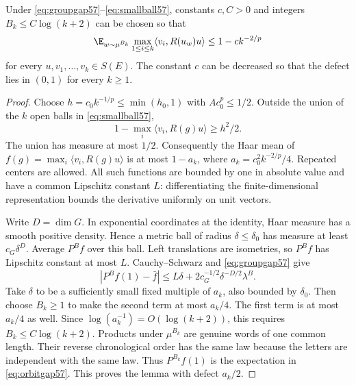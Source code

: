 \begin{lemma}\label{lem:orbitgap57}
Under \eqref{eq:groupgap57}--\eqref{eq:smallball57}, constants $c,C>0$ and integers $B_k\le C\log(k+2)$ can be chosen so that
\begin{equation}\label{eq:orbitgap57}
 \E_{w\sim\mu^{B_k}}\max_{1\le i\le k}
       \langle v_i,R(u_w)u\rangle\le1-c k^{-2/p}
\end{equation}
for every $u,v_1,\ldots,v_k\in S(E)$. The constant $c$ can be decreased so that the defect lies in $(0,1)$ for every $k\ge1$.
\end{lemma}
\begin{proof}
Choose $h=c_0k^{-1/p}\le\min(h_0,1)$ with $A c_0^p\le1/2$. Outside the union of the $k$ open balls in \eqref{eq:smallball57},
\[
 1-\max_i\langle v_i,R(g)u\rangle\ge h^2/2.
\]
The union has measure at most $1/2$. Consequently the Haar mean of
$f(g)=\max_i\langle v_i,R(g)u\rangle$ is at most $1-a_k$, where
$a_k=c_0^2k^{-2/p}/4$. Repeated centers are allowed. All such functions are bounded by one in absolute value and have a common Lipschitz constant $L$: differentiating the finite-dimensional representation bounds the derivative uniformly on unit vectors.

Write $D=\dim G$. In exponential coordinates at the identity, Haar measure has a smooth positive density. Hence a metric ball of radius $\delta\le\delta_0$ has measure at least $c_G\delta^D$. Average $P^Bf$ over this ball. Left translations are isometries, so $P^Bf$ has Lipschitz constant at most $L$. Cauchy--Schwarz and \eqref{eq:groupgap57} give
\[
 |P^Bf(1)-\bar f|
 \le L\delta+2c_G^{-1/2}\delta^{-D/2}\lambda^B.
\]
Take $\delta$ to be a sufficiently small fixed multiple of $a_k$, also bounded by $\delta_0$. Then choose $B_k\ge1$ to make the second term at most $a_k/4$. The first term is at most $a_k/4$ as well. Since $\log(a_k^{-1})=O(\log(k+2))$, this requires $B_k\le C\log(k+2)$. Products under $\mu^{B_k}$ are genuine words of one common length. Their reverse chronological order has the same law because the letters are independent with the same law. Thus $P^{B_k}f(1)$ is the expectation in \eqref{eq:orbitgap57}. This proves the lemma with defect $a_k/2$.
\end{proof}

